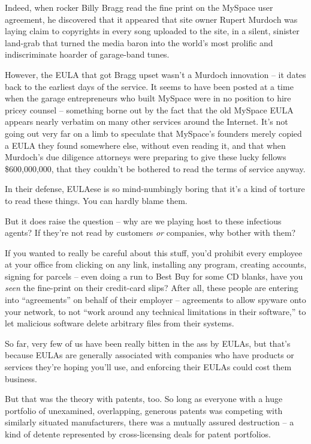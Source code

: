 Indeed, when rocker Billy Bragg read the fine print on the MySpace
user agreement, he discovered that it appeared that site owner
Rupert Murdoch was laying claim to copyrights in every song
uploaded to the site, in a silent, sinister land-grab that turned
the media baron into the world's most prolific and indiscriminate
hoarder of garage-band tunes.

However, the EULA that got Bragg upset wasn't a Murdoch innovation
-- it dates back to the earliest days of the service. It seems to
have been posted at a time when the garage entrepreneurs who built
MySpace were in no position to hire pricey counsel -- something
borne out by the fact that the old MySpace EULA appears nearly
verbatim on many other services around the Internet. It's not going
out very far on a limb to speculate that MySpace's founders merely
copied a EULA they found somewhere else, without even reading it,
and that when Murdoch's due diligence attorneys were preparing to
give these lucky fellows \$600,000,000, that they couldn't be
bothered to read the terms of service anyway.

In their defense, EULAese is so mind-numbingly boring that it's a
kind of torture to read these things. You can hardly blame them.

But it does raise the question -- why are we playing host to these
infectious agents? If they're not read by customers \emph{or}
companies, why bother with them?

If you wanted to really be careful about this stuff, you'd prohibit
every employee at your office from clicking on any link, installing
any program, creating accounts, signing for parcels -- even doing a
run to Best Buy for some CD blanks, have you \emph{seen} the
fine-print on their credit-card slips? After all, these people are
entering into ``agreements'' on behalf of their employer --
agreements to allow spyware onto your network, to not ``work around
any technical limitations in their software,'' to let malicious
software delete arbitrary files from their systems.

So far, very few of us have been really bitten in the ass by EULAs,
but that's because EULAs are generally associated with companies
who have products or services they're hoping you'll use, and
enforcing their EULAs could cost them business.

But that was the theory with patents, too. So long as everyone with
a huge portfolio of unexamined, overlapping, generous patents was
competing with similarly situated manufacturers, there was a
mutually assured destruction -- a kind of detente represented by
cross-licensing deals for patent portfolios.

